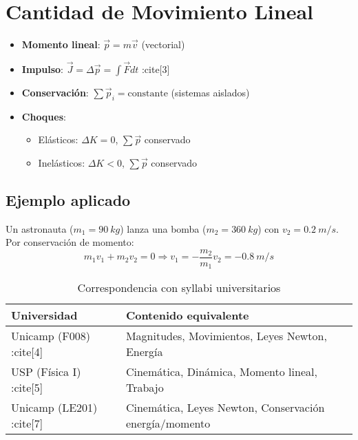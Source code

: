 \documentclass[12pt, a4paper, spanish]{article}
\begin{document}
\section{Cantidad de Movimiento Lineal}
\begin{itemize}
    \item \textbf{Momento lineal}: $\vec{p} = m\vec{v}$ (vectorial)
    \item \textbf{Impulso}: $\vec{J} = \Delta \vec{p} = \int \vec{F} dt$ :cite[3]
    \item \textbf{Conservación}: $\sum \vec{p}_i = \text{constante}$ (sistemas aislados)
    \item \textbf{Choques}:
    \begin{itemize}
        \item Elásticos: $\Delta K = 0$, $\sum \vec{p}$ conservado
        \item Inelásticos: $\Delta K < 0$, $\sum \vec{p}$ conservado
    \end{itemize}
\end{itemize}

\subsection*{Ejemplo aplicado}
Un astronauta ($m_1 = \SI{90}{kg}$) lanza una bomba ($m_2 = \SI{360}{kg}$) con $v_2 = \SI{0.2}{m/s}$. Por conservación de momento:
\[
m_1 v_1 + m_2 v_2 = 0 \Rightarrow v_1 = -\frac{m_2}{m_1} v_2 = \SI{-0.8}{m/s}
\]

\begin{table}[h]
\centering
\caption{Correspondencia con syllabi universitarios}
\begin{tabular}{@{}ll@{}}
\toprule
\textbf{Universidad} & \textbf{Contenido equivalente} \\ \midrule
Unicamp (F008) :cite[4] & Magnitudes, Movimientos, Leyes Newton, Energía \\
USP (Física I) :cite[5] & Cinemática, Dinámica, Momento lineal, Trabajo \\
Unicamp (LE201) :cite[7] & Cinemática, Leyes Newton, Conservación energía/momento \\ \bottomrule
\end{tabular}
\end{table}
\end{document}
